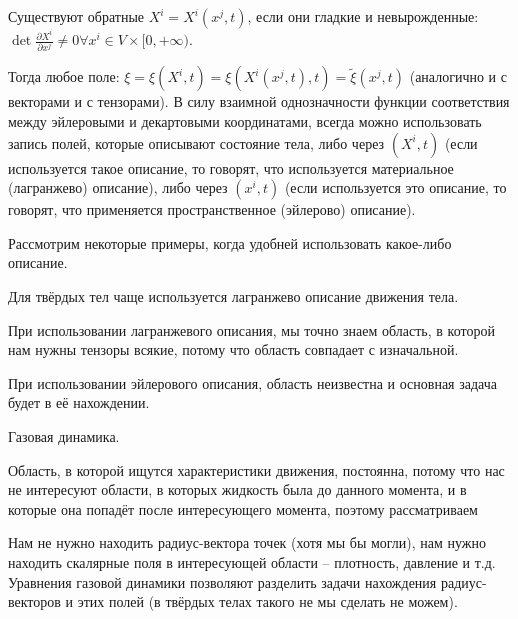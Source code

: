 Существуют обратные $X^i = X^i ( x^j, t )$, если они гладкие и невырожденные: $\det \frac{\partial X^i}{\partial x^j} \neq 0 \forall x^i \in V \times [0, +\infty)$.

Тогда любое поле: $\xi = \xi(X^i, t) = \xi(X^i(x^j, t), t) = \tilde{\xi} (x^j, t)$ (аналогично и с
векторами и с тензорами). В силу взаимной однозначности функции соответствия между эйлеровыми и 
декартовыми координатами, всегда можно использовать запись полей, которые описывают состояние
тела, либо через $(X^i, t)$ (если используется такое описание, то говорят, что используется
материальное (лагранжево) описание), либо через $(x^i, t)$ (если используется это описание, то 
говорят, что применяется пространственное (эйлерово) описание).

Рассмотрим некоторые примеры, когда удобней использовать какое-либо описание.

\begin{example} 
  Для твёрдых тел чаще используется лагранжево описание движения тела.
  
  \begin{figure}[H]
  	\centering
  	
  \end{figure}
  
  При использовании лагранжевого описания, мы точно знаем область, в которой нам нужны тензоры
  всякие, потому что область совпадает с изначальной.

  При использовании эйлерового описания, область неизвестна и основная задача будет в её
  нахождении.
\end{example}

\begin{example}
  Газовая динамика.
  
  \begin{figure}[H]
  	\centering
  	
  \end{figure}
  
  Область, в которой ищутся характеристики движения, постоянна, потому что нас не интересуют
  области, в которых жидкость была до данного момента, и в которые она попадёт после интересующего 
  момента, поэтому рассматриваем

  Нам не нужно находить радиус-вектора точек (хотя мы бы могли), нам нужно находить скалярные поля
  в интересующей области -- плотность, давление и т.д. Уравнения газовой динамики позволяют разделить
  задачи нахождения радиус-векторов и этих полей (в твёрдых телах такого не мы сделать не можем).
\end{example}

